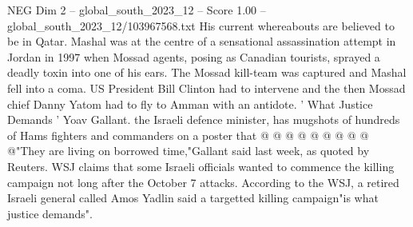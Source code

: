 \begin{textsample}{NEG Dim 2 – global\_south\_2023\_12 – Score 1.00 – global\_south\_2023\_12/103967568.txt}
His current whereabouts are believed to be in Qatar.
Mashal was at the centre of a sensational assassination attempt in Jordan in 1997 when Mossad agents, posing as Canadian tourists, sprayed a deadly toxin into one of his ears.
The Mossad kill-team was captured and Mashal fell into a coma.
US President Bill Clinton had to intervene and the then Mossad chief Danny Yatom had to fly to Amman with an antidote. ' What Justice Demands ' Yoav Gallant. the Israeli defence minister, has mugshots of hundreds of Hams fighters and commanders on a poster that @ @ @ @ @ @ @ @ @ @"They are living on borrowed time,"Gallant said last week, as quoted by Reuters.
WSJ claims that some Israeli officials wanted to commence the killing campaign not long after the October 7 attacks.
According to the WSJ, a retired Israeli general called Amos Yadlin said a targetted killing campaign"is what justice demands".

\end{textsample}
